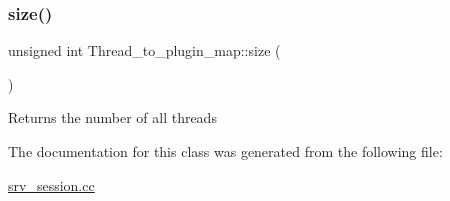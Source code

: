 \subsubsection{\texorpdfstring{size()}{size()}}
{\footnotesize\ttfamily unsigned int Thread\+\_\+to\+\_\+plugin\+\_\+map\+::size (\begin{DoxyParamCaption}{ }\end{DoxyParamCaption})\hspace{0.3cm}{\ttfamily [inline]}}

Returns the number of all threads 

The documentation for this class was generated from the following file\+:\begin{DoxyCompactItemize}
\item 
\mbox{\hyperlink{srv__session_8cc}{srv\+\_\+session.\+cc}}\end{DoxyCompactItemize}
